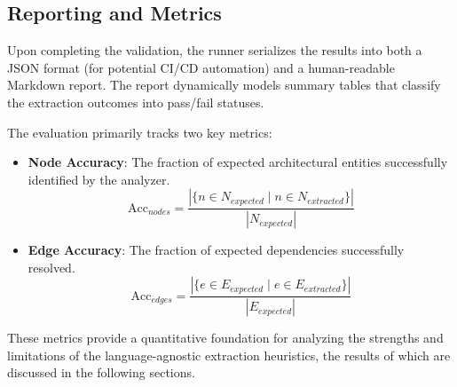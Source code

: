 \subsection{Reporting and Metrics}
Upon completing the validation, the runner serializes the results
into both a JSON format (for potential CI/CD automation) and a
human-readable Markdown report. The report dynamically models summary
tables that classify the extraction outcomes into pass/fail statuses.

The evaluation primarily tracks two key metrics:
\begin{itemize}
  \item \textbf{Node Accuracy}: The fraction of expected
    architectural entities successfully identified by the analyzer.
    \[
      \text{Acc}_{nodes} = \frac{|\{n \in N_{expected} \mid n \in
      N_{extracted}\}|}{|N_{expected}|}
    \]
  \item \textbf{Edge Accuracy}: The fraction of expected dependencies
    successfully resolved.
    \[
      \text{Acc}_{edges} = \frac{|\{e \in E_{expected} \mid e \in
      E_{extracted}\}|}{|E_{expected}|}
    \]
\end{itemize}

These metrics provide a quantitative foundation for analyzing the
strengths and limitations of the language-agnostic extraction
heuristics, the results of which are discussed in the following sections.
